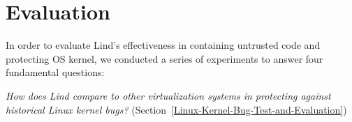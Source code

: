 \section{Evaluation}
\label{sec.evaluation}


In order to evaluate Lind's effectiveness in containing untrusted code and
protecting OS kernel, we conducted a series of experiments to answer
four fundamental questions:

\textit{How does Lind compare to other virtualization systems
in protecting against historical Linux kernel bugs?}
(Section~{\ref{Linux-Kernel-Bug-Test-and-Evaluation}})

